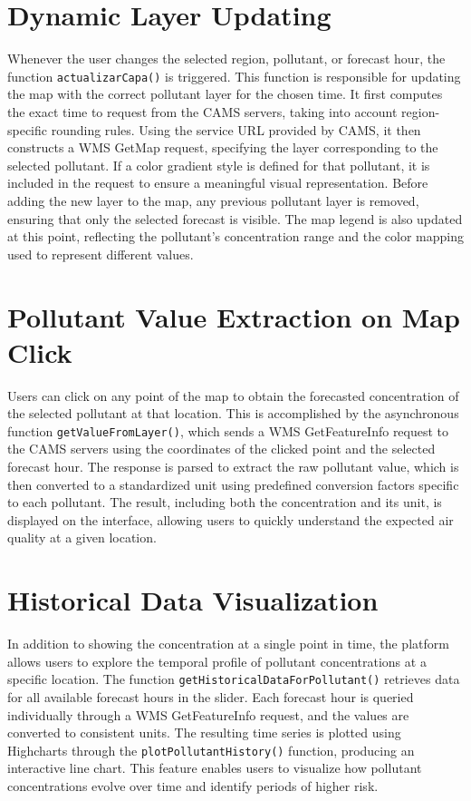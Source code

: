 \section{Dynamic Layer Updating}

Whenever the user changes the selected region, pollutant, or forecast hour, the function \texttt{actualizarCapa()} is triggered. This function is responsible for updating the map with the correct pollutant layer for the chosen time. It first computes the exact time to request from the CAMS servers, taking into account region-specific rounding rules. Using the service URL provided by CAMS, it then constructs a WMS GetMap request, specifying the layer corresponding to the selected pollutant. If a color gradient style is defined for that pollutant, it is included in the request to ensure a meaningful visual representation. Before adding the new layer to the map, any previous pollutant layer is removed, ensuring that only the selected forecast is visible. The map legend is also updated at this point, reflecting the pollutant’s concentration range and the color mapping used to represent different values.

\section{Pollutant Value Extraction on Map Click}
Users can click on any point of the map to obtain the forecasted concentration of the selected pollutant at that location. This is accomplished by the asynchronous function \texttt{getValueFromLayer()}, which sends a WMS GetFeatureInfo request to the CAMS servers using the coordinates of the clicked point and the selected forecast hour. The response is parsed to extract the raw pollutant value, which is then converted to a standardized unit using predefined conversion factors specific to each pollutant. The result, including both the concentration and its unit, is displayed on the interface, allowing users to quickly understand the expected air quality at a given location.


\section{Historical Data Visualization}
In addition to showing the concentration at a single point in time, the platform allows users to explore the temporal profile of pollutant concentrations at a specific location. The function \texttt{getHistoricalDataForPollutant()} retrieves data for all available forecast hours in the slider. Each forecast hour is queried individually through a WMS GetFeatureInfo request, and the values are converted to consistent units. The resulting time series is plotted using Highcharts through the \texttt{plotPollutantHistory()} function, producing an interactive line chart. This feature enables users to visualize how pollutant concentrations evolve over time and identify periods of higher risk.


